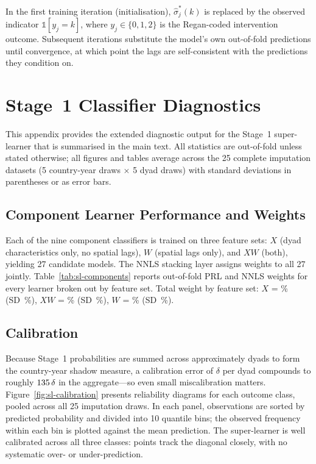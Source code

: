 In the first training iteration (initialisation), $\hat{\sigma}_j^*(k)$ is
replaced by the observed indicator $\mathbb{1}[y_j = k]$, where $y_j \in \{0, 1, 2\}$
is the Regan-coded intervention outcome.  Subsequent iterations substitute the
model's own out-of-fold predictions until convergence, at which point the lags
are self-consistent with the predictions they condition on.

\section{Stage~1 Classifier Diagnostics}
\label{app:sl}

This appendix provides the extended diagnostic output for the Stage~1
super-learner that is summarised in the main text.  All statistics are
out-of-fold unless stated otherwise; all figures and tables average across
the 25 complete imputation datasets (5 country-year draws $\times$ 5 dyad draws)
with standard deviations in parentheses or as error bars.

\subsection{Component Learner Performance and Weights}

Each of the nine component classifiers is trained on three feature sets:
$X$ (dyad characteristics only, no spatial lags), $W$ (spatial lags only),
and $XW$ (both), yielding 27 candidate models.  The NNLS stacking layer
assigns weights to all 27 jointly.
Table~\ref{tab:sl-components} reports out-of-fold PRL and NNLS weights
for every learner broken out by feature set.
Total weight by feature set: $X$ = \WtX\% (SD~\WtXsd\%), $XW$ = \WtXW\%
(SD~\WtXWsd\%), $W$ = \WtW\% (SD~\WtWsd\%).



\subsection{Calibration}

Because Stage~1 probabilities are summed across approximately
\NumInterveners{} dyads to
form the country-year shadow measure, a calibration error of $\delta$ per dyad
compounds to roughly $135\,\delta$ in the aggregate---so even small
miscalibration matters.  Figure~\ref{fig:sl-calibration} presents reliability diagrams
for each outcome class, pooled across all 25 imputation draws.  In each
panel, observations are sorted by predicted probability and divided into
10 quantile bins; the observed frequency within each bin is plotted against
the mean prediction.  The super-learner is well calibrated across all three
classes: points track the diagonal closely, with no systematic over- or
under-prediction.

